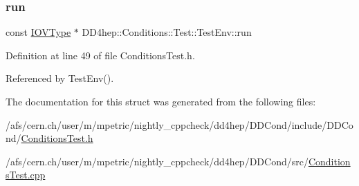 \hypertarget{struct_d_d4hep_1_1_conditions_1_1_test_1_1_test_env_adf17ffc8d010573be87030ddc963d947}{}\label{struct_d_d4hep_1_1_conditions_1_1_test_1_1_test_env_adf17ffc8d010573be87030ddc963d947} 
\subsubsection{\texorpdfstring{run}{run}}
{\footnotesize\ttfamily const \hyperlink{class_d_d4hep_1_1_i_o_v_type}{I\+O\+V\+Type} $\ast$ D\+D4hep\+::\+Conditions\+::\+Test\+::\+Test\+Env\+::run}



Definition at line 49 of file Conditions\+Test.\+h.



Referenced by Test\+Env().



The documentation for this struct was generated from the following files\+:\begin{DoxyCompactItemize}
\item 
/afs/cern.\+ch/user/m/mpetric/nightly\+\_\+cppcheck/dd4hep/\+D\+D\+Cond/include/\+D\+D\+Cond/\hyperlink{include_2_d_d_cond_2_conditions_test_8h}{Conditions\+Test.\+h}\item 
/afs/cern.\+ch/user/m/mpetric/nightly\+\_\+cppcheck/dd4hep/\+D\+D\+Cond/src/\hyperlink{_conditions_test_8cpp}{Conditions\+Test.\+cpp}\end{DoxyCompactItemize}
